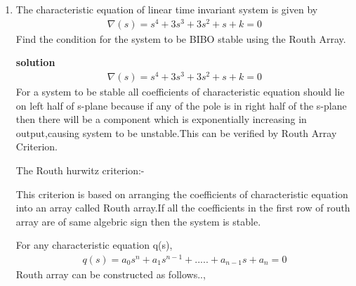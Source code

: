 \begin{enumerate}[label=\thesubsection.\arabic*.,ref=\thesubsection.\theenumi]
\item 
The characteristic equation of linear time invariant system is given by
\begin{align} 
\nabla(s)=s^4+3s^3+3s^2+s+k=0
\end{align}
Find the condition for the system to be BIBO stable using the Routh Array.

\textbf{solution}
\begin{align}
\nabla(s)=s^4+3s^3+3s^2+s+k=0
\end{align}
For a system to be stable all coefficients of characteristic equation should lie on left half of s-plane because if any of the pole is in right half of the s-plane then there will be a component which is exponentially increasing in output,causing system to be unstable.This can be verified by Routh Array Criterion.


The Routh hurwitz criterion:-


This criterion is based on arranging the coefficients of characteristic equation into an array called Routh array.If all the coefficients in the first row of routh array are of same algebric sign then the system is stable.


For any characteristic equation q(s),
\begin{multline}
q(s) = a_0s^n+a_1s^{n-1}+.....+a_{n-1}s+a_n = 0
\end{multline}
Routh array can be constructed as follows..,
 

\end{enumerate}
